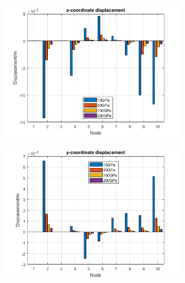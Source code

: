 \documentclass[11pt]{article}
\begin{document}
\begin{figure}[H]
    \centering
    \begin{subfigure}{.5\textwidth}
        \centering
        \includegraphics[width=\linewidth]{img/fig3}
        \caption{}
    \end{subfigure}%
    \begin{subfigure}{.5\textwidth}
        \centering
        \includegraphics[width=\linewidth]{img/fig4}
        \caption{}
    \end{subfigure}
    \caption{}
    \label{fig:case1}
\end{figure}
\end{document}
